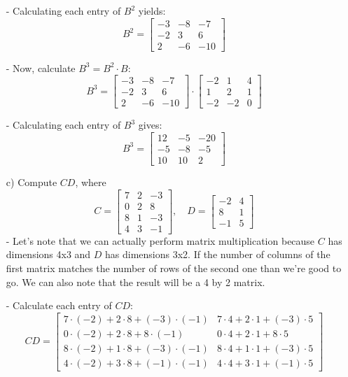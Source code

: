 \begin{sol}
\begin{enumerate}
        - Calculating each entry of $B^2$ yields:
          \[
          B^2 = \begin{bmatrix} -3 & -8 & -7 \\ -2 & 3 & 6 \\ 2 & -6 & -10 \end{bmatrix}
          \]

        - Now, calculate $B^3 = B^2 \cdot B$:
          \[
          B^3 = \begin{bmatrix} -3 & -8 & -7 \\ -2 & 3 & 6 \\ 2 & -6 & -10 \end{bmatrix} \cdot \begin{bmatrix} -2 & 1 & 4 \\ 1 & 2 & 1 \\ -2 & -2 & 0 \end{bmatrix}
          \]
          
          - Calculating each entry of $B^3$ gives:
            \[
            B^3 = \begin{bmatrix} 12 & -5 & -20 \\ -5 & -8 & -5 \\ 10 & 10 & 2 \end{bmatrix}
            \]

        \item[c)] Compute $CD$, where 
        \[
        C = \begin{bmatrix} 7 & 2 & -3 \\ 0 & 2 & 8 \\ 8 & 1 & -3 \\ 4 & 3 & -1 \end{bmatrix}, \quad D = \begin{bmatrix} -2 & 4 \\ 8 & 1 \\ -1 & 5 \end{bmatrix}
        \]
        - Let's note that we can actually perform matrix multiplication because $C$ has dimensions 4x3 and $D$ has dimensions 3x2. If the number of columns of the first matrix matches the number of rows of the second one than we're good to go. We can also note that the result will be a 4 by 2 matrix.  
        
        - Calculate each entry of $CD$:
          \[
          CD = \begin{bmatrix} 7 \cdot (-2) + 2 \cdot 8 + (-3) \cdot (-1) & 7 \cdot 4 + 2 \cdot 1 + (-3) \cdot 5 \\ 0 \cdot (-2) + 2 \cdot 8 + 8 \cdot (-1) & 0 \cdot 4 + 2 \cdot 1 + 8 \cdot 5 \\ 8 \cdot (-2) + 1 \cdot 8 + (-3) \cdot (-1) & 8 \cdot 4 + 1 \cdot 1 + (-3) \cdot 5 \\ 4 \cdot (-2) + 3 \cdot 8 + (-1) \cdot (-1) & 4 \cdot 4 + 3 \cdot 1 + (-1) \cdot 5 \end{bmatrix}
          \]
          

\end{enumerate}
\end{sol}
